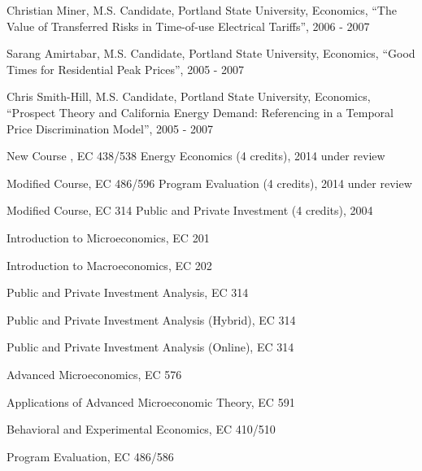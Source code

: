 \documentclass[Computer Science]{vita}
\begin{document}
\begin{vita}
\begin{Instructional Activities}
\begin{M.S. Project Adviser}
    \item Christian Miner, M.S. Candidate, Portland State University,
      Economics, ``The Value of Transferred Risks in Time-of-use
      Electrical Tariffs'', 2006 - 2007

    \item Sarang Amirtabar, M.S. Candidate, Portland State University,
      Economics, ``Good Times for Residential Peak Prices'', 2005 -
      2007

    \item Chris Smith-Hill, M.S. Candidate, Portland State University,
      Economics, ``Prospect Theory and California Energy Demand:
      Referencing in a Temporal Price Discrimination Model'', 2005 -
      2007
    \end{M.S. Project Adviser}

    \begin{Curriculum Development}
    \item New Course , EC 438/538 Energy Economics (4 credits), 2014 under review
    \item Modified Course, EC 486/596 Program Evaluation (4 credits), 2014 under review
    \item Modified Course, EC 314 Public and Private Investment (4
      credits), 2004
    \end{Curriculum Development}

    \begin{Courses}
    \item Introduction to Microeconomics, EC 201
    \item Introduction to Macroeconomics, EC 202
    \item Public and Private Investment Analysis, EC 314
    \item Public and Private Investment Analysis (Hybrid), EC 314
    \item Public and Private Investment Analysis (Online), EC 314
				
    \item Advanced Microeconomics, EC 576
    \item Applications of Advanced Microeconomic Theory, EC 591

    \item Behavioral and Experimental Economics, EC 410/510
    \item Program Evaluation, EC 486/586
    \end{Courses}

      
  \end{Instructional Activities}
  \begin{Professional and Service Activities}


\end{Professional and Service Activities}
\end{vita}
\end{document}
